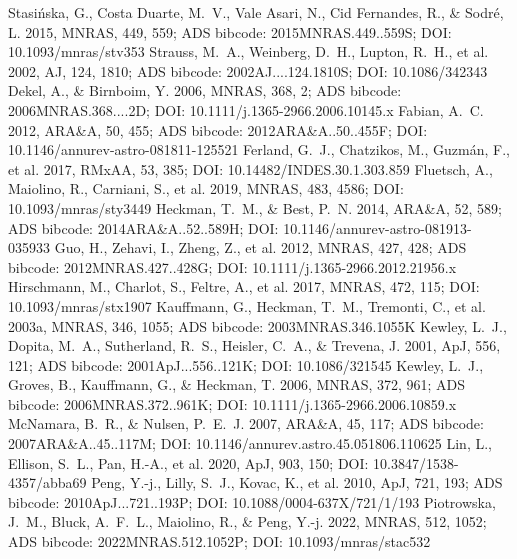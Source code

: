 \documentclass[twocolumn]{aastex631}
\begin{document}
\begin{thebibliography}{}
 Stasi{\'n}ska, G., Costa Duarte, M.~V., Vale Asari, N., Cid Fernandes, R., \& Sodr{\'e}, L. 2015, MNRAS, 449, 559; ADS bibcode: 2015MNRAS.449..559S; DOI: 10.1093/mnras/stv353
 Strauss, M.~A., Weinberg, D.~H., Lupton, R.~H., et al. 2002, AJ, 124, 1810; ADS bibcode: 2002AJ....124.1810S; DOI: 10.1086/342343
 Dekel, A., \& Birnboim, Y. 2006, MNRAS, 368, 2; ADS bibcode: 2006MNRAS.368....2D; DOI: 10.1111/j.1365-2966.2006.10145.x
 Fabian, A.~C. 2012, ARA\&A, 50, 455; ADS bibcode: 2012ARA\&A..50..455F; DOI: 10.1146/annurev-astro-081811-125521
 Ferland, G.~J., Chatzikos, M., Guzm\'an, F., et al. 2017, RMxAA, 53, 385; DOI: 10.14482/INDES.30.1.303.859
 Fluetsch, A., Maiolino, R., Carniani, S., et al. 2019, MNRAS, 483, 4586; DOI: 10.1093/mnras/sty3449
 Heckman, T.~M., \& Best, P.~N. 2014, ARA\&A, 52, 589; ADS bibcode: 2014ARA\&A..52..589H; DOI: 10.1146/annurev-astro-081913-035933
 Guo, H., Zehavi, I., Zheng, Z., et al. 2012, MNRAS, 427, 428; ADS bibcode: 2012MNRAS.427..428G; DOI: 10.1111/j.1365-2966.2012.21956.x
 Hirschmann, M., Charlot, S., Feltre, A., et al. 2017, MNRAS, 472, 115; DOI: 10.1093/mnras/stx1907
 Kauffmann, G., Heckman, T.~M., Tremonti, C., et al. 2003a, MNRAS, 346, 1055; ADS bibcode: 2003MNRAS.346.1055K
 Kewley, L.~J., Dopita, M.~A., Sutherland, R.~S., Heisler, C.~A., \& Trevena, J. 2001, ApJ, 556, 121; ADS bibcode: 2001ApJ...556..121K; DOI: 10.1086/321545
 Kewley, L.~J., Groves, B., Kauffmann, G., \& Heckman, T. 2006, MNRAS, 372, 961; ADS bibcode: 2006MNRAS.372..961K; DOI: 10.1111/j.1365-2966.2006.10859.x
 McNamara, B.~R., \& Nulsen, P.~E.~J. 2007, ARA\&A, 45, 117; ADS bibcode: 2007ARA\&A..45..117M; DOI: 10.1146/annurev.astro.45.051806.110625
 Lin, L., Ellison, S.~L., Pan, H.-A., et al. 2020, ApJ, 903, 150; DOI: 10.3847/1538-4357/abba69
 Peng, Y.-j., Lilly, S.~J., Kovac, K., et al. 2010, ApJ, 721, 193; ADS bibcode: 2010ApJ...721..193P; DOI: 10.1088/0004-637X/721/1/193
 Piotrowska, J.~M., Bluck, A.~F.~L., Maiolino, R., \& Peng, Y.-j. 2022, MNRAS, 512, 1052; ADS bibcode: 2022MNRAS.512.1052P; DOI: 10.1093/mnras/stac532

\end{thebibliography}
\end{document}
